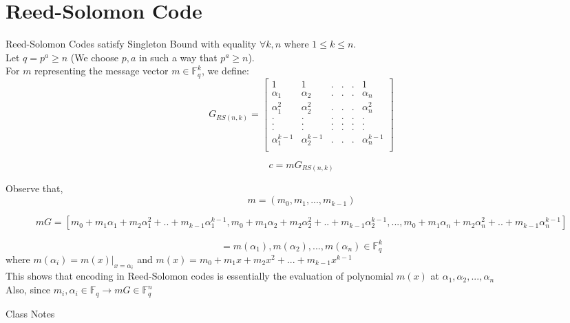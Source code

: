 \documentclass[11pt]{article}
\theoremstyle{definition}
\theoremstyle{plain}
\begin{document}
\section{Reed-Solomon Code}
Reed-Solomon Codes satisfy Singleton Bound with equality $\forall k,n$ where $1 \leq k \leq n.$\\


Let $q=p^{a} \geq n$ (We choose $p,a$ in such a way that $p^{a} \geq n $).\\

For $m$ representing the message vector $m \in \mathbb{F}_{q}^{k}$, we define:
\[ G_{RS(n,k)} = \begin{bmatrix}
1 & 1 & . & . & . & 1 \\
\alpha_{1} & \alpha_{2} & . & . & . & \alpha_{n}\\
\alpha_{1}^{2} & \alpha_{2}^{2} & . & . & . & \alpha_{n}^{2} \\
. & . & . & . & . & . \\
. & . & . & . & . & . \\
. & . & . & . & . & . \\
\alpha_{1}^{k-1} & \alpha_{2}^{k-1} & . & . & . & \alpha_{n}^{k-1} \\
\end{bmatrix}
\]

$$\boxed{c =mG_{RS(n,k)}}$$

Observe that,
\[m = (m_{0} , m_{1}, ... , m_{k-1})\]

\[mG = [m_{0} + m_{1}\alpha_{1} +m_{2}\alpha_{1}^{2}+ . .  +m_{k-1}\alpha_{1}^{k-1}, m_{0} + m_{1}\alpha_{2} +m_{2}\alpha_{2}^{2}+ . .  +m_{k-1}\alpha_{2}^{k-1}, ... , m_{0} + m_{1}\alpha_{n} +m_{2}\alpha_{n}^{2}+ . .  +m_{k-1}\alpha_{n}^{k-1} ] \]

\[=m(\alpha_{1}), m(\alpha_{2}),..., m(\alpha_{n}) \in \mathbb{F}_{q}^{k} \] 
where $m(\alpha_{i}) = m(x) |_{x = \alpha_{i} }$ and $m(x)= m_{0} + m_{1}x +m_{2}x^{2}+ . . . +m_{k-1}x^{k-1}$\\

This shows that encoding in Reed-Solomon codes is essentially the evaluation of polynomial $m(x)$ at $\alpha_{1}, \alpha_{2},... ,\alpha_{n}$\\

Also, since $m_{i} , \alpha_{i} \in \mathbb{F}_{q} \rightarrow mG \in \mathbb{F}_{q}^{n}$


\begin{thebibliography}{1}
Class Notes
\end{thebibliography}
\end{document}
